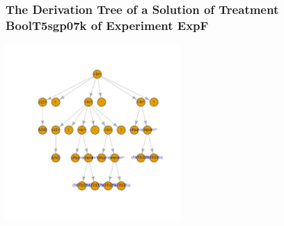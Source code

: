  \begin{frame}
 \frametitle{ The Derivation Tree of a Solution of Treatment BoolT5sgp07k of Experiment ExpF }
 \begin{center}
\includegraphics[width=0.5\textwidth, angle=0]
{ExpFDerivationTreeFigure005.pdf}
 \end{center}
 \label{report/ExpFDerivationTreeFigure005.pdf}  
 \end{frame}

